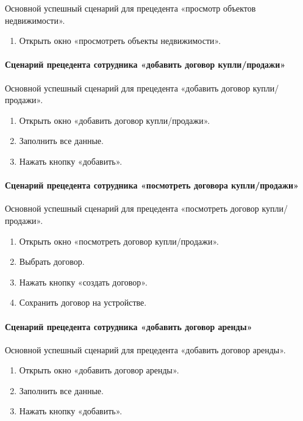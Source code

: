 Основной успешный сценарий для прецедента «просмотр объектов недвижимости».
\begin{enumerate}
\item	Открыть окно «просмотреть объекты недвижимости».
\end{enumerate}
\paragraph{Сценарий прецедента сотрудника «добавить договор купли/продажи»}

Основной успешный сценарий для прецедента «добавить договор купли/продажи».
\begin{enumerate}
\item	Открыть окно «добавить договор купли/продажи».

\item	Заполнить все данные.

\item	Нажать кнопку «добавить».
\end{enumerate}
\paragraph{Сценарий прецедента сотрудника «посмотреть договора купли/продажи»}

Основной успешный сценарий для прецедента «посмотреть договор купли/продажи».
\begin{enumerate}
\item	Открыть окно «посмотреть договор купли/продажи».

\item	Выбрать договор.

\item	Нажать кнопку «создать договор».

\item	Сохранить договор на устройстве.
\end{enumerate}
\paragraph{Сценарий прецедента сотрудника «добавить договор аренды»}

Основной успешный сценарий для прецедента «добавить договор аренды».
\begin{enumerate}
\item	Открыть окно «добавить договор аренды».

\item	Заполнить все данные.

\item	Нажать кнопку «добавить».
\end{enumerate}
